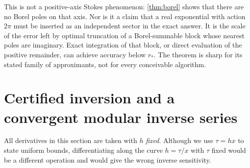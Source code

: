 \documentclass[11pt,a4paper]{article}
\theoremstyle{definition}
\theoremstyle{remark}
\begin{document}
This is not a positive-axis Stokes phenomenon: \cref{thm:borel} shows that
there are no Borel poles on that axis. Nor is it a claim that a real
exponential with action $2\pi$ must be inserted as an independent sector
in the exact answer. It is the scale of the error left by optimal
truncation of a Borel-summable block whose nearest poles are imaginary.
Exact integration of that block, or direct evaluation of the positive
remainder, can achieve accuracy below $r_*$. The theorem is sharp for its
stated family of approximants, not for every conceivable algorithm.

\section{Certified inversion and a convergent modular inverse series}
\label{sec:inverse}
All derivatives in this section are taken with $h$ \emph{fixed}. Although
we use $\tau=hx$ to state uniform bounds, differentiating along the curve
$h=\tau/x$ with $\tau$ fixed would be a different operation and would give
the wrong inverse sensitivity.
\end{document}
